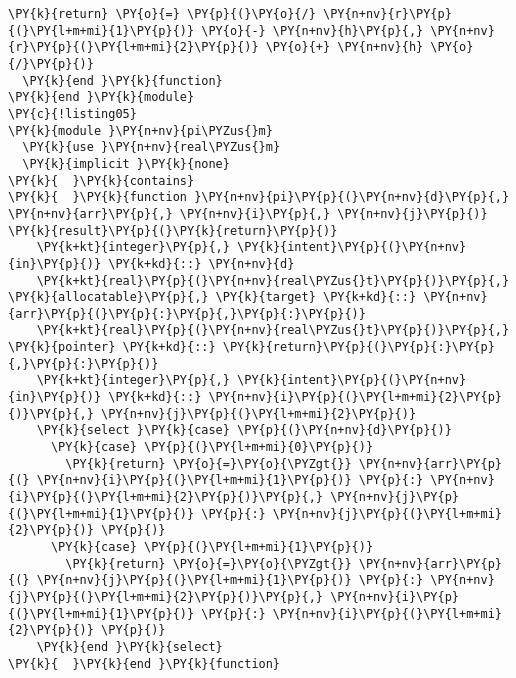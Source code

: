 \begin{Verbatim}[commandchars=\\\{\}]
    \PY{k}{return} \PY{o}{=} \PY{p}{(}\PY{o}{/} \PY{n+nv}{r}\PY{p}{(}\PY{l+m+mi}{1}\PY{p}{)} \PY{o}{-} \PY{n+nv}{h}\PY{p}{,} \PY{n+nv}{r}\PY{p}{(}\PY{l+m+mi}{2}\PY{p}{)} \PY{o}{+} \PY{n+nv}{h} \PY{o}{/}\PY{p}{)}
  \PY{k}{end }\PY{k}{function}
\PY{k}{end }\PY{k}{module}
\PY{c}{!listing05}
\PY{k}{module }\PY{n+nv}{pi\PYZus{}m}
  \PY{k}{use }\PY{n+nv}{real\PYZus{}m}
  \PY{k}{implicit }\PY{k}{none}
\PY{k}{  }\PY{k}{contains}
\PY{k}{  }\PY{k}{function }\PY{n+nv}{pi}\PY{p}{(}\PY{n+nv}{d}\PY{p}{,} \PY{n+nv}{arr}\PY{p}{,} \PY{n+nv}{i}\PY{p}{,} \PY{n+nv}{j}\PY{p}{)} \PY{k}{result}\PY{p}{(}\PY{k}{return}\PY{p}{)}
    \PY{k+kt}{integer}\PY{p}{,} \PY{k}{intent}\PY{p}{(}\PY{n+nv}{in}\PY{p}{)} \PY{k+kd}{::} \PY{n+nv}{d}
    \PY{k+kt}{real}\PY{p}{(}\PY{n+nv}{real\PYZus{}t}\PY{p}{)}\PY{p}{,} \PY{k}{allocatable}\PY{p}{,} \PY{k}{target} \PY{k+kd}{::} \PY{n+nv}{arr}\PY{p}{(}\PY{p}{:}\PY{p}{,}\PY{p}{:}\PY{p}{)}
    \PY{k+kt}{real}\PY{p}{(}\PY{n+nv}{real\PYZus{}t}\PY{p}{)}\PY{p}{,} \PY{k}{pointer} \PY{k+kd}{::} \PY{k}{return}\PY{p}{(}\PY{p}{:}\PY{p}{,}\PY{p}{:}\PY{p}{)}
    \PY{k+kt}{integer}\PY{p}{,} \PY{k}{intent}\PY{p}{(}\PY{n+nv}{in}\PY{p}{)} \PY{k+kd}{::} \PY{n+nv}{i}\PY{p}{(}\PY{l+m+mi}{2}\PY{p}{)}\PY{p}{,} \PY{n+nv}{j}\PY{p}{(}\PY{l+m+mi}{2}\PY{p}{)}
    \PY{k}{select }\PY{k}{case} \PY{p}{(}\PY{n+nv}{d}\PY{p}{)} 
      \PY{k}{case} \PY{p}{(}\PY{l+m+mi}{0}\PY{p}{)} 
        \PY{k}{return} \PY{o}{=}\PY{o}{\PYZgt{}} \PY{n+nv}{arr}\PY{p}{(} \PY{n+nv}{i}\PY{p}{(}\PY{l+m+mi}{1}\PY{p}{)} \PY{p}{:} \PY{n+nv}{i}\PY{p}{(}\PY{l+m+mi}{2}\PY{p}{)}\PY{p}{,} \PY{n+nv}{j}\PY{p}{(}\PY{l+m+mi}{1}\PY{p}{)} \PY{p}{:} \PY{n+nv}{j}\PY{p}{(}\PY{l+m+mi}{2}\PY{p}{)} \PY{p}{)}   
      \PY{k}{case} \PY{p}{(}\PY{l+m+mi}{1}\PY{p}{)} 
        \PY{k}{return} \PY{o}{=}\PY{o}{\PYZgt{}} \PY{n+nv}{arr}\PY{p}{(} \PY{n+nv}{j}\PY{p}{(}\PY{l+m+mi}{1}\PY{p}{)} \PY{p}{:} \PY{n+nv}{j}\PY{p}{(}\PY{l+m+mi}{2}\PY{p}{)}\PY{p}{,} \PY{n+nv}{i}\PY{p}{(}\PY{l+m+mi}{1}\PY{p}{)} \PY{p}{:} \PY{n+nv}{i}\PY{p}{(}\PY{l+m+mi}{2}\PY{p}{)} \PY{p}{)}   
    \PY{k}{end }\PY{k}{select}
\PY{k}{  }\PY{k}{end }\PY{k}{function}


\end{Verbatim}
